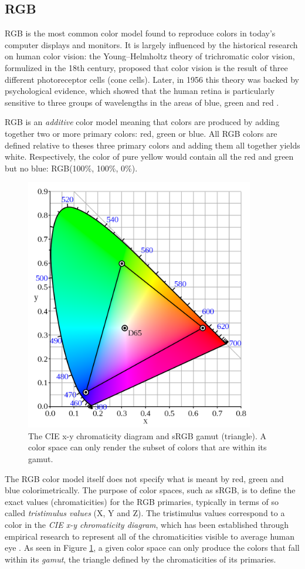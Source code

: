 \documentclass[thesis.tex]{subfiles}
\begin{document}
\subsection{RGB}
RGB is the most common color model found to reproduce colors in today's computer displays and monitors. It is largely influenced by the historical research on human color vision: the Young–Helmholtz theory of trichromatic color vision, formulized in the 18th century, proposed that color vision is the result of three different photoreceptor cells (cone cells). Later, in 1956 this theory was backed by psychological evidence, which showed that the human retina is particularly sensitive to three groups of wavelengths in the areas of blue, green and red \cite{svaetichin}.

RGB is an \textit{additive} color model meaning that colors are produced by adding together two or more primary colors: red, green or blue. All RGB colors are defined relative to theses three primary colors and adding them all together yields white. Respectively, the color of pure yellow would contain all the red and green but no blue: RGB(100\%, 100\%, 0\%).

\begin{figure}[hb]
\centering \includegraphics[width=10cm]{images/srgb}
\caption{The CIE x-y chromaticity diagram and sRGB gamut (triangle). A color space can only render the subset of colors that are within its gamut.\label{figure:srgb}}
\end{figure}

The RGB color model itself does not specify what is meant by red, green and blue colorimetrically. The purpose of color spaces, such as sRGB, is to define the exact values (chromaticities) for the RGB primaries, typically in terms of so called \textit{tristimulus values} (X, Y and Z). The tristimulus values correspond to a color in the \textit{CIE x-y chromaticity diagram}, which has been established through empirical research to represent all of the chromaticities visible to average human eye \cite{cie}. As seen in Figure \ref{figure:srgb}, a given color space can only produce the colors that fall within its \textit{gamut}, the triangle defined by the chromaticities of its primaries.
\end{document}
